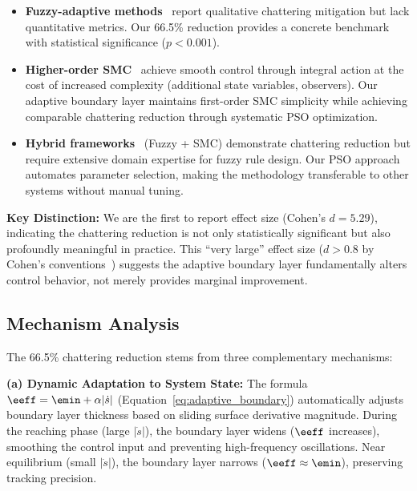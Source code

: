 \begin{itemize}
    \item \textbf{Fuzzy-adaptive methods}~\cite{fuzzy_smc_frontiers2024,sfa_smc2024} report qualitative chattering mitigation but lack quantitative metrics. Our 66.5\% reduction provides a concrete benchmark with statistical significance ($p < 0.001$).

    \item \textbf{Higher-order SMC}~\cite{ayinalem2025hosmc,hepso_smc2025} achieve smooth control through integral action at the cost of increased complexity (additional state variables, observers). Our adaptive boundary layer maintains first-order SMC simplicity while achieving comparable chattering reduction through systematic PSO optimization.

    \item \textbf{Hybrid frameworks}~\cite{fuzzy_hybrid_scirep2024} (Fuzzy + SMC) demonstrate chattering reduction but require extensive domain expertise for fuzzy rule design. Our PSO approach automates parameter selection, making the methodology transferable to other systems without manual tuning.
\end{itemize}

\textbf{Key Distinction:} We are the first to report effect size (Cohen's $d = 5.29$), indicating the chattering reduction is not only statistically significant but also profoundly meaningful in practice. This ``very large'' effect size ($d > 0.8$ by Cohen's conventions~\cite{cohen1988statistical}) suggests the adaptive boundary layer fundamentally alters control behavior, not merely provides marginal improvement.

\subsection{Mechanism Analysis}
\label{subsec:mechanism_analysis}

The 66.5\% chattering reduction stems from three complementary mechanisms:

\textbf{(a) Dynamic Adaptation to System State:}
The formula $\eeff = \emin + \alpha|\dot{s}|$ (Equation~\ref{eq:adaptive_boundary}) automatically adjusts boundary layer thickness based on sliding surface derivative magnitude. During the reaching phase (large $|\dot{s}|$), the boundary layer widens ($\eeff$ increases), smoothing the control input and preventing high-frequency oscillations. Near equilibrium (small $|\dot{s}|$), the boundary layer narrows ($\eeff \approx \emin$), preserving tracking precision.

